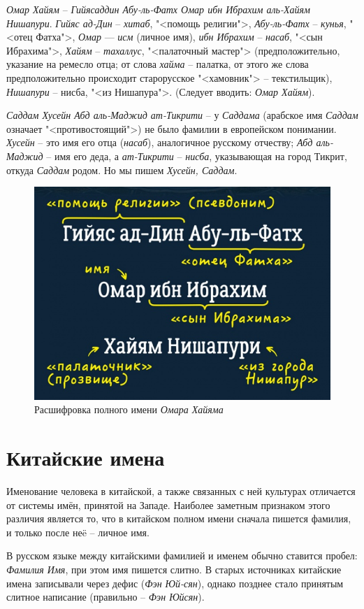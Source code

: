 \emph{Омар Хайям} -- \emph{Гийясаддин Абу-ль-Фатх Омар ибн Ибрахим аль-Хайям Нишапури}. \emph{Гийяс ад-Дин} -- \emph{хитаб}, "<помощь религии">, \emph{Абу-ль-Фатх} -- \emph{кунья}, "<отец Фатха">, \emph{Омар} — \emph{исм} (личное имя), \emph{ибн Ибрахим} -- \emph{насаб}, "<сын Ибрахима">, \emph{Хайям} -- \emph{тахаллус}, "<палаточный мастер"> (предположительно, указание на ремесло отца; от слова \emph{хайма} -- палатка, от этого же слова предположительно происходит старорусское "<хамовник"> -- текстильщик), \emph{Нишапури} -- нисба, "<из Нишапура">. (Следует вводить: \emph{Омар Хайям}).

\emph{Саддам Хусейн Абд аль-Маджид ат-Тикрити} -- у \emph{Саддама} (арабское имя \emph{Саддам} означает "<противостоящий">) не было фамилии в европейском понимании. \emph{Хусейн} -- это имя его отца (\emph{насаб}), аналогичное русскому отчеству; \emph{Абд аль-Маджид} -- имя его деда, а \emph{ат-Тикрити} -- \emph{нисба}, указывающая на город Тикрит, откуда \emph{Саддам} родом. Но мы пишем \emph{Хусейн, Саддам}.

\begin{figure}
    \centering
    \includegraphics[width=0.7\linewidth]{img/haiyam}
    \caption{Расшифровка полного имени \emph{Омара Хайяма}}
    \label{fig:haiyam}
\end{figure}

\section{Китайские имена}

Именование человека в китайской, а также связанных с ней культурах отличается от системы имён, принятой на Западе. Наиболее заметным признаком этого различия является то, что в китайском полном имени сначала пишется фамилия, и только после не\"e -- личное имя.

В русском языке между китайскими фамилией и именем обычно ставится пробел: \emph{Фамилия Имя}, при этом имя пишется слитно. В старых источниках китайские имена записывали через дефис (\emph{Фэн Юй-сян}), однако позднее стало принятым слитное написание (правильно -- \emph{Фэн Юйсян}).

